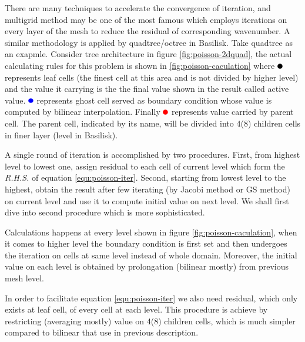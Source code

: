 There are many techniques to accelerate the convergence of iteration, and multigrid method\cite{1995_Wesseling} may be one of the most famous which employs iterations on every layer of the mesh to reduce the residual of corresponding wavenumber. A similar methodology is applied by quadtree/octree in Basilisk. Take quadtree as an exapmle. Consider tree architecture in figure \ref{fig:poisson-2dquad}, the actual calculating rules for this problem is shown in \ref{fig:poisson-caculation} where $\activetest$ represents leaf cells (the finest cell at this area and is not divided by higher level) and the value it carrying is the the final value shown in the result called active value.
$\prolong$ represents ghost cell served as boundary condition whose value is computed by bilinear interpolation. Finally $\rest$ represents value carried by parent cell. The parent cell, indicated by its name, will be divided into 4(8) children cells in finer layer (level in Basilisk).\cite{2018_VanHooft}\par
A single round of iteration is accomplished by two procedures. First, from highest level to lowest one, assign residual to each cell of current level which form the \emph{R.H.S.} of equation \ref{equ:poisson-iter}. Second, starting from lowest level to the highest, obtain the result after few iterating (by Jacobi method or GS method) on current level and use it to compute initial value on next level. We shall first dive into second procedure which is more sophisticated.\par
Calculations happens at every level shown in figure \ref{fig:poisson-caculation}, when it comes to higher level the boundary condition is first set and then undergoes the iteration on cells at same level instead of whole domain. Moreover, the initial value on each level is obtained by prolongation (bilinear mostly) from previous mesh level.\par
In order to facilitate equation \ref{equ:poisson-iter} we also need residual, which only exists at leaf cell, of every cell at each level. This procedure is achieve by restricting\cite{2015_Popinet} (averaging mostly) value on 4(8) children cells, which is much simpler compared to bilinear that use in previous description.\par 
